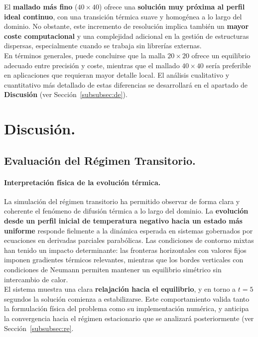 \documentclass{article}
\begin{document}
El \textbf{mallado más fino} ($40 \times 40$) ofrece una \textbf{solución muy próxima al perfil ideal continuo}, con una transición térmica suave y homogénea a lo largo del dominio. No obstante, este incremento de resolución implica también un \textbf{mayor coste computacional} y una complejidad adicional en la gestión de estructuras dispersas, especialmente cuando se trabaja sin librerías externas.\\

\noindent En términos generales, puede concluirse que la malla $20 \times 20$ ofrece un equilibrio adecuado entre precisión y coste, mientras que el mallado $40 \times 40$ sería preferible en aplicaciones que requieran mayor detalle local. El análisis cualitativo y cuantitativo más detallado de estas diferencias se desarrollará en el apartado de \textbf{Discusión} (ver Sección~\ref{subsubsec:de}).



\newpage
\section{Discusión.}
\subsection{Evaluación del Régimen Transitorio.}
\label{subsubsec:dt}
\paragraph{Interpretación física de la evolución térmica.} La simulación del régimen transitorio ha permitido observar de forma clara y coherente el fenómeno de difusión térmica a lo largo del dominio. La \textbf{evolución desde un perfil inicial de temperatura negativo hacia un estado más uniforme} responde fielmente a la dinámica esperada en sistemas gobernados por ecuaciones en derivadas parciales parabólicas. Las condiciones de contorno mixtas han tenido un impacto determinante: las fronteras horizontales con valores fijos imponen gradientes térmicos relevantes, mientras que los bordes verticales con condiciones de Neumann permiten mantener un equilibrio simétrico sin intercambio de calor.\\

El sistema muestra una clara \textbf{relajación hacia el equilibrio}, y en torno a $t=5$ segundos la solución comienza a estabilizarse. Este comportamiento valida tanto la formulación física del problema como su implementación numérica, y anticipa la convergencia hacia el régimen estacionario que se analizará posteriormente (ver Sección~\ref{subsubsec:re}.
\end{document}
